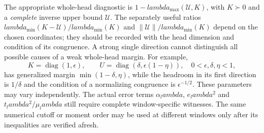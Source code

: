 \documentclass[11pt]{article}
\def\lambda{lambda}%
\theoremstyle{remark}
\begin{document}
The appropriate whole-head diagnostic is
$1-\lambda_{\max}(\mathcal U,K)$, with $K\succ0$ and a
\emph{complete} inverse upper bound $\mathcal U$.  The separately
useful ratios $\lambda_{\min}(K-\mathcal U)/\lambda_{\min}(K)$ and
$\|\mathcal U\|/\lambda_{\min}(K)$ depend on the chosen coordinates;
they should be recorded with the head dimension and condition of
its congruence.  A strong single direction cannot distinguish all
possible causes of a weak whole-head margin.  For example,
\[
 K=\operatorname{diag}(1,\epsilon),\qquad
 U=\operatorname{diag}(\delta,\epsilon(1-\eta)),
 \quad 0<\epsilon,\delta,\eta<1,
\]
has generalized margin $\min(1-\delta,\eta)$, while the headroom
in its first direction is $1/\delta$ and the condition of a
normalizing congruence is $\epsilon^{-1/2}$.  These parameters
may vary independently.  The actual error terms
$\alpha_\lambda$, $e_\lambda^2$ and $t_\lambda^2/\mu_\lambda$
still require complete window-specific witnesses.  The same
numerical cutoff or moment order may be used at different windows
only after its inequalities are verified afresh.
\end{document}
